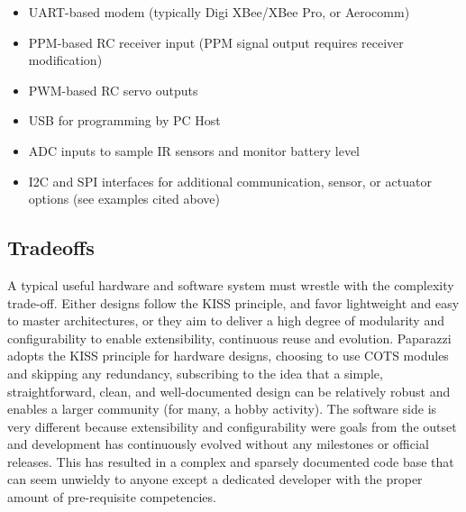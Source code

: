 \documentclass[a4paper,11pt]{report}
\begin{document}
\begin{itemize}
\item UART-based modem (typically Digi XBee/XBee Pro, or Aerocomm)
\item PPM-based RC receiver input (PPM signal output requires receiver modification)
\item PWM-based RC servo outputs
\item USB for programming by PC Host
\item ADC inputs to sample IR sensors and monitor battery level
\item I2C and SPI interfaces for additional communication, sensor, or actuator options (see examples cited above)
\end{itemize}

\subsection{Tradeoffs}

A typical useful hardware and software system must wrestle with the complexity trade-off. Either designs follow the KISS principle, and favor lightweight and easy to master architectures, or they aim to deliver a high degree of modularity and configurability to enable extensibility, continuous reuse and evolution. Paparazzi adopts the KISS principle for hardware designs, choosing to use COTS modules and skipping any redundancy, subscribing to the idea that a simple, straightforward, clean, and well-documented design can be relatively robust and enables a larger community (for many, a hobby activity). The software side is very different because extensibility and configurability were goals from the outset and development has continuously evolved without any milestones or official releases. This has resulted in a complex and sparsely documented code base that can seem unwieldy to anyone except a dedicated developer with the proper amount of pre-requisite competencies.
\end{document}
